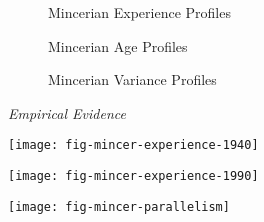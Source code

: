 \begin{frame}
\begin{figure}[htp]\centering
\caption{Mincerian Experience Profiles}\label{Mincerian Experience Profiles}
\end{figure}
\end{frame}

\begin{frame}
\begin{figure}[htp]\centering
\caption{Mincerian Age Profiles}\label{Mincerian Age Profiles}
\end{figure}
\end{frame}


\begin{frame}
\begin{figure}[htp]\centering
\caption{Mincerian Variance Profiles}\label{Mincerian Variance Profiles}
\end{figure}
\end{frame}

\begin{frame}\begin{center}
\LARGE\textit{Empirical Evidence}
\end{center}\end{frame}

\begin{frame}[plain]
\begin{center}
\texttt{[image: fig-mincer-experience-1940]}
\end{center}
\end{frame}

\begin{frame}[plain]
\begin{center}
\texttt{[image: fig-mincer-experience-1990]}
\end{center}
\end{frame}

\begin{frame}[plain]
\begin{center}
\texttt{[image: fig-mincer-parallelism]}
\end{center}
\end{frame}

